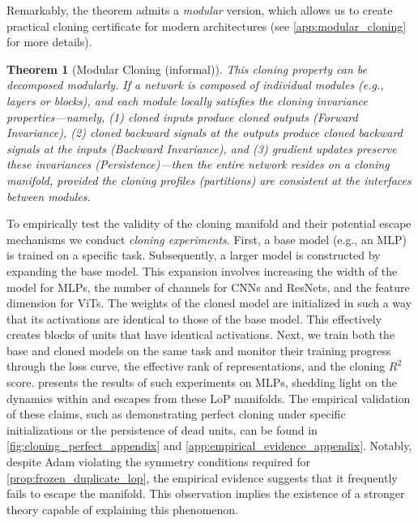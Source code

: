 \documentclass{article}
\newtheorem{theorem}{Theorem}[section]
\numberwithin{figure}{section}
\begin{document}
Remarkably, the theorem admits a \emph{modular} version, which  allows us to create practical cloning certificate for modern  architectures (see \cref{app:modular_cloning} for more details). 
\begin{theorem}[Modular Cloning (informal)]
\label{cor:modular_cloning}
This cloning property can be decomposed modularly. If a network is composed of individual modules (e.g., layers or blocks), and each module locally satisfies the cloning invariance properties—namely, (1) cloned inputs produce cloned outputs (Forward Invariance), (2) cloned backward signals at the outputs produce cloned backward signals at the inputs (Backward Invariance), and (3) gradient updates preserve these invariances (Persistence)—then the entire network resides on a cloning manifold, provided the cloning profiles (partitions) are consistent at the interfaces between modules.
\end{theorem}

To empirically test the validity of the cloning manifold and their potential escape mechanisms we conduct \emph{cloning experiments}. First, a base model (e.g., an MLP) is trained on a specific task. Subsequently, a larger model is constructed by expanding the base model. This expansion involves increasing the width of the model for MLPs, the number of channels for CNNs and ResNets, and the feature dimension for ViTs. The weights of the cloned model are initialized in such a way that its activations are identical to those of the base model. This effectively creates blocks of units that have identical activations. Next, we train both the base and cloned models on the same task and monitor their training progress through the loss curve, the effective rank of representations, and the cloning $R^2$ score.  presents the results of such experiments on MLPs, shedding light on the dynamics within and escapes from these LoP manifolds.
The empirical validation of these claims, such as demonstrating perfect cloning under specific initializations or the persistence of dead units, can be found in \cref{fig:cloning_perfect_appendix} and \cref{app:empirical_evidence_appendix}. Notably, despite Adam violating the symmetry conditions required for \cref{prop:frozen_duplicate_lop}, the empirical evidence suggests that it frequently fails to escape the manifold. This observation implies the existence of a stronger theory capable of explaining this phenomenon.
\end{document}
